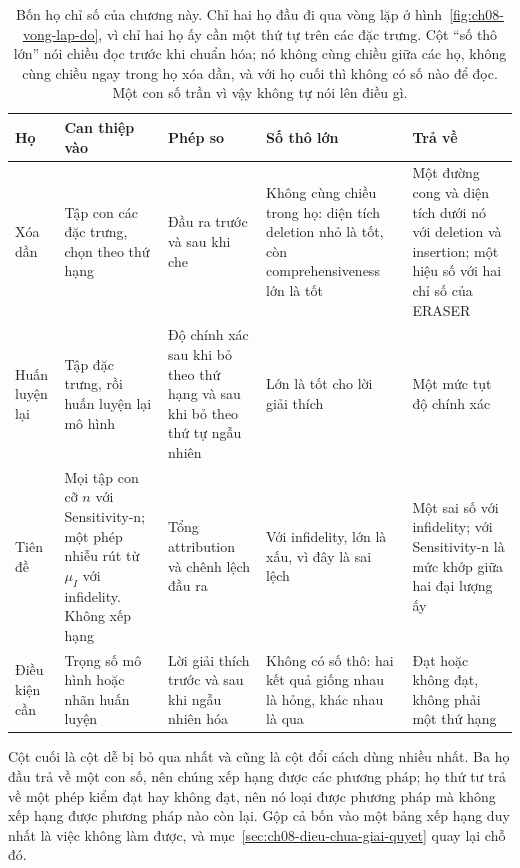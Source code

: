 \begin{table}[htbp]
  \centering
  \footnotesize
  \caption{Bốn họ chỉ số của chương này. Chỉ hai họ đầu đi qua vòng lặp ở
  hình~\ref{fig:ch08-vong-lap-do}, vì chỉ hai họ ấy cần một thứ tự trên các đặc
  trưng. Cột \enquote{số thô lớn} nói chiều đọc trước khi chuẩn hóa; nó không
  cùng chiều giữa các họ, không cùng chiều ngay trong họ xóa dần, và với họ cuối
  thì không có số nào để đọc. Một con số trần vì vậy không tự nói lên điều gì.}
  \label{tab:ch08-bon-ho}
  \begin{tabular}{@{}p{2cm}p{3cm}p{3cm}p{3cm}p{2cm}@{}}
    \toprule
    Họ & Can thiệp vào & Phép so & Số thô lớn & Trả về \\
    \midrule
    Xóa dần & Tập con các đặc trưng, chọn theo thứ hạng &
    Đầu ra trước và sau khi che &
    Không cùng chiều trong họ: diện tích deletion nhỏ là tốt, còn
    comprehensiveness lớn là tốt &
    Một đường cong và diện tích dưới nó với deletion và insertion; một hiệu số
    với hai chỉ số của ERASER \\
    \addlinespace
    Huấn luyện lại & Tập đặc trưng, rồi huấn luyện lại mô hình &
    Độ chính xác sau khi bỏ theo thứ hạng và sau khi bỏ theo thứ tự ngẫu nhiên &
    Lớn là tốt cho lời giải thích &
    Một mức tụt độ chính xác \\
    \addlinespace
    Tiên đề & Mọi tập con cỡ $n$ với Sensitivity-n; một phép nhiễu rút từ
    $\mu_I$ với infidelity. Không xếp hạng &
    Tổng attribution và chênh lệch đầu ra &
    Với infidelity, lớn là xấu, vì đây là sai lệch &
    Một sai số với infidelity; với Sensitivity-n là mức khớp giữa hai đại lượng
    ấy \\
    \addlinespace
    Điều kiện cần & Trọng số mô hình hoặc nhãn huấn luyện &
    Lời giải thích trước và sau khi ngẫu nhiên hóa &
    Không có số thô: hai kết quả giống nhau là hỏng, khác nhau là qua &
    Đạt hoặc không đạt, không phải một thứ hạng \\
    \bottomrule
  \end{tabular}
\end{table}

Cột cuối là cột dễ bị bỏ qua nhất và cũng là cột đổi cách dùng nhiều nhất. Ba
họ đầu trả về một con số, nên chúng xếp hạng được các phương pháp; họ thứ tư trả
về một phép kiểm đạt hay không đạt, nên nó loại được phương pháp mà không xếp
hạng được phương pháp nào còn lại. Gộp cả bốn vào một bảng xếp hạng duy nhất là
việc không làm được, và
mục~\ref{sec:ch08-dieu-chua-giai-quyet} quay lại chỗ đó.
